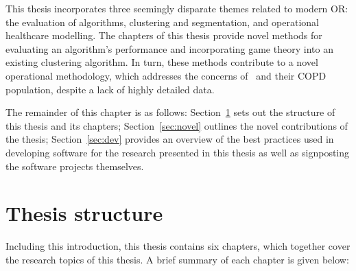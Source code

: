 This thesis incorporates three seemingly disparate themes related to modern OR:
the evaluation of algorithms, clustering and segmentation, and operational
healthcare modelling. The chapters of this thesis provide novel methods for
evaluating an algorithm's performance and incorporating game theory into an
existing clustering algorithm. In turn, these methods contribute to a novel
operational methodology, which addresses the concerns of \ctmuhb\ and their COPD
population, despite a lack of highly detailed data.

The remainder of this chapter is as follows: Section~\ref{sec:thesis} sets out
the structure of this thesis and its chapters; Section~\ref{sec:novel} outlines
the novel contributions of the thesis; Section~\ref{sec:dev} provides an
overview of the best practices used in developing software for the research
presented in this thesis as well as signposting the software projects
themselves.


\section{Thesis structure}\label{sec:thesis}

Including this introduction, this thesis contains six chapters, which together
cover the research topics of this thesis. A brief summary of each chapter is
given below:

